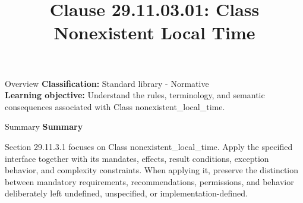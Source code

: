 \documentclass[10pt,letterpaper]{article}
\title{Clause 29.11.03.01: Class Nonexistent Local Time}
\author{}
\date{}
\begin{document}
\maketitle
\begin{CornellOverviewBox}{Overview}
\textbf{Classification:} Standard library - Normative\\[2pt]
\textbf{Learning objective:} Understand the rules, terminology, and semantic consequences associated with Class nonexistent\_local\_time.
\end{CornellOverviewBox}\begin{CornellSummaryBox}{Summary}
{\sffamily\bfseries\color{Accent} Summary}\par\vspace{3pt}Section 29.11.3.1 focuses on Class nonexistent\_local\_time. Apply the specified interface together with its mandates, effects, result conditions, exception behavior, and complexity constraints. When applying it, preserve the distinction between mandatory requirements, recommendations, permissions, and behavior deliberately left undefined, unspecified, or implementation-defined.
\end{CornellSummaryBox}
\end{document}

